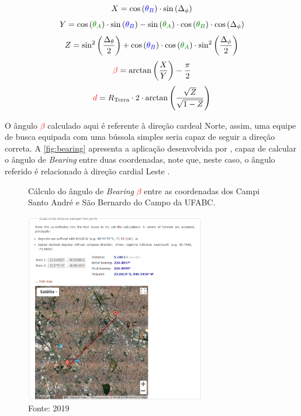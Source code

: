 \begin{equation}
    X = \cos\left(\textcolor{Blue}{\theta_B}\right)\cdot \sin\left(\Delta_\phi\right)
\end{equation}
\begin{equation}
    Y = \cos\left(\textcolor{Green}{\theta_A}\right)\cdot\sin\left(\textcolor{Blue}{\theta_B}\right) - \sin\left(\textcolor{Green}{\theta_A}\right) \cdot \cos\left(\textcolor{Green}{\theta_B}\right) \cdot \cos\left(\Delta_\phi\right)
\end{equation}
\begin{equation}
    Z = \sin^2\left(\frac{\Delta_\theta}{2}\right) + \cos\left(\textcolor{Blue}{\theta_B}\right) \cdot \cos\left(\textcolor{Green}{\theta_A}\right) \cdot \sin^2\left(\frac{\Delta_\phi}{2}\right)
\end{equation}
\begin{equation}
    \textcolor{Red}{\beta} = \arctan\left(\frac{X}{Y}\right) - \frac{\pi}{2}
\end{equation}
\begin{equation}
    \textcolor{Red}{d} = R_\text{Terra} \cdot 2 \cdot \arctan\left(\frac{\sqrt{Z}}{\sqrt{1-Z}}\right)
\end{equation}

O ângulo \textcolor{Red}{$\beta$} calculado aqui é referente à direção cardeal Norte, assim, uma equipe de busca equipada com uma bússola simples seria capaz de seguir a direção correta.
A \autoref{fig:bearing} apresenta a aplicação desenvolvida por \citeauthor{chrisveness}, capaz de calcular o ângulo de \textit{Bearing} entre duas coordenadas, note que, neste caso, o ângulo referido é relacionado à direção cardial Leste \cite{chrisveness}.

\begin{figure}[htbp]
    \centering
    \caption{Cálculo do ângulo de \textit{Bearing} \textcolor{Red}{$\beta$} entre as coordenadas dos Campi Santo André e São Bernardo do Campo da UFABC.}
    \includegraphics[width=0.7\textwidth]{../pictures/bearing.png}
    \caption*{Fonte: \citeauthor{chrisveness} 2019 \cite{chrisveness}}
    \label{fig:bearing}
\end{figure}


